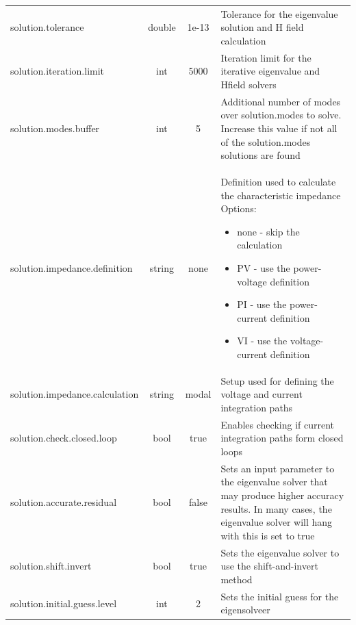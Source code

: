 \documentclass[titlepage]{article}
\renewcommand\_{\textunderscore\linebreak[1]}
\begin{document}
\begin{longtable}[c]{|lccp{8cm}|}
    solution.tolerance            & double & 1e-13  & Tolerance for the eigenvalue solution and H field calculation \\
    solution.iteration.limit      & int    & 5000   & Iteration limit for the iterative eigenvalue and Hfield solvers \\
    solution.modes.buffer         & int    & 5      & Additional number of modes over solution.modes to solve.  Increase this value if not all of the solution.modes solutions are found \\
    solution.impedance.definition & string & none & Definition used to calculate the characteristic impedance
                                                   Options:
                                                   \begin{itemize}[nosep]
                                                     \item none - skip the calculation
                                                     \item PV   - use the power-voltage definition
                                                     \item PI   - use the power-current definition
                                                     \item VI   - use the voltage-current definition
                                                   \end{itemize} \\
    solution.impedance.calculation & string & modal & Setup used for defining the voltage and current integration paths \\
    solution.check.closed.loop    & bool   & true   & Enables checking if current integration paths form closed loops \\
    solution.accurate.residual    & bool   & false  & Sets an input parameter to the eigenvalue solver that may produce higher accuracy results. In many cases, the eigenvalue solver will hang with this is set to true \\
    solution.shift.invert         & bool   & true   & Sets the eigenvalue solver to use the shift-and-invert method \\
    solution.initial.guess.level  & int    & 2      & Sets the initial guess for the eigensolveer 


\end{longtable}
\end{document}
